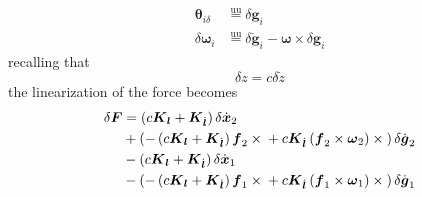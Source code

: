 \documentclass[10pt,dvips,fleqn]{report}
\newcommand{\T}[1]{\boldsymbol{#1}}
\newcommand{\equu}{\overset{\mathrm{uu}}{=}}
\begin{document}
\begin{align}
	\T{\theta}_{i\delta} &\equu \delta\T{g}_i \\
	\delta\T{\omega}_i &\equu \delta\dot{\T{g}}_i - \T{\omega}\times\delta\T{g}_i
\end{align}
recalling that
\begin{equation}
	\delta{z} = c \delta\dot{z}
\end{equation}
the linearization of the force becomes
\begin{align}
	\delta\T{F} &= \plbr{c\T{K}_{\T{l}} + \T{K}_{\dot{\T{l}}}} \delta\dot{\T{x}}_2
		\nonumber \\
		& + \plbr{
			- \plbr{c\T{K}_{\T{l}} + \T{K}_{\dot{\T{l}}}} \T{f}_2\times{}
			+ c \T{K}_{\dot{\T{l}}} \plbr{\T{f}_2 \times \T{\omega}_2}\times{}
		} \delta\dot{\T{g}}_2
		\nonumber \\
		& - \plbr{c\T{K}_{\T{l}} + \T{K}_{\dot{\T{l}}}} \delta\dot{\T{x}}_1
		\nonumber \\
		& - \plbr{
			- \plbr{c\T{K}_{\T{l}} + \T{K}_{\dot{\T{l}}}} \T{f}_1\times{}
			+ c \T{K}_{\dot{\T{l}}} \plbr{\T{f}_1 \times \T{\omega}_1}\times{}
		} \delta\dot{\T{g}}_1
\end{align}
\end{document}
